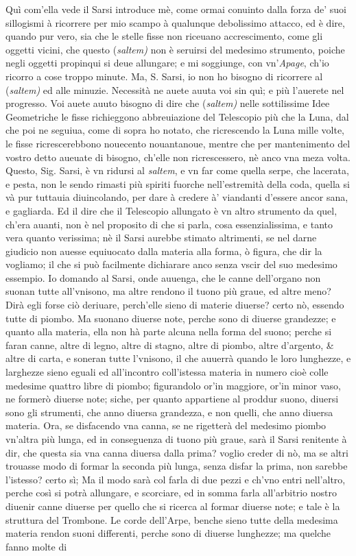 \documentclass[11pt,twoside,openany]{book}
\begin{document}
Quì com'ella vede il Sarsi introduce mè, come ormai conuinto dalla forza de' suoi sillogismi à ricorrere per mio scampo à qualunque debolissimo attacco, ed è dire, quando pur vero, sia che le stelle fisse non riceuano accrescimento, come gli oggetti vicini, che questo (\textit{saltem}\textit{)} non è seruirsi del medesimo strumento, poiche negli oggetti propinqui si deue allungare; e mi soggiunge, con vn'\textit{Apage}, ch'io ricorro a cose troppo minute. Ma, S. Sarsi, io non ho bisogno di ricorrere al (\textit{saltem}\textit{) }ed alle minuzie. Necessità ne auete auuta voi sin quì; e più l'auerete nel progresso. Voi auete auuto bisogno di dire che (\textit{saltem}\textit{)} nelle sottilissime Idee Geometriche le fisse richieggono abbreuiazione del Telescopio più che la Luna, dal che poi ne seguiua, come di sopra ho notato, che ricrescendo la Luna mille volte, le fisse ricrescerebbono nouecento nouantanoue, mentre che per mantenimento del vostro detto aueuate di bisogno, ch'elle non ricrescessero, nè anco vna meza volta. Questo, Sig. Sarsi, è vn ridursi al \textit{saltem}, e vn far come quella serpe, che lacerata, e pesta, non le sendo rimasti più spiriti fuorche nell'estremità della coda, quella si và pur tuttauia diuincolando, per dare à credere à' viandanti d'essere ancor sana, e gagliarda. Ed il dire che il Telescopio allungato è vn altro strumento da quel, ch'era auanti, non è nel proposito di che si parla, cosa essenzialissima, e tanto vera quanto verissima; nè il Sarsi aurebbe stimato altrimenti, se nel darne giudicio non auesse equiuocato dalla materia alla forma, ò figura, che dir la vogliamo; il che si può facilmente dichiarare anco senza vscir del suo medesimo essempio. Io domando al Sarsi, onde auuenga, che le canne dell'organo non suonan tutte all'vnisono, ma altre rendono il tuono più graue, ed altre meno? Dirà egli forse ciò deriuare, perch'elle sieno di materie diuerse? certo nò, essendo tutte di piombo. Ma suonano diuerse note, perche sono di diuerse grandezze; e quanto alla materia, ella non hà parte alcuna nella forma del suono; perche si faran canne, altre di legno, altre di stagno, altre di piombo, altre d'argento, \& altre di carta, e soneran tutte l'vnisono, il che auuerrà quando le loro lunghezze, e larghezze sieno eguali ed all'incontro coll'istessa materia in numero cioè colle medesime quattro libre di piombo; figurandolo or'in maggiore, or'in minor vaso, ne formerò diuerse note; siche, per quanto appartiene al proddur suono, diuersi sono gli strumenti, che anno diuersa grandezza, e non quelli, che anno diuersa materia. Ora, se disfacendo vna canna, se ne rigetterà del medesimo piombo vn'altra più lunga, ed in conseguenza di tuono più graue, sarà il Sarsi renitente à dir, che questa sia vna canna diuersa dalla prima? voglio creder di nò, ma se altri trouasse modo di formar la seconda più lunga, senza disfar la prima, non sarebbe l'istesso? certo sì; Ma il modo sarà col farla di due pezzi e ch'vno entri nell'altro, perche così si potrà allungare, e scorciare, ed in somma farla all'arbitrio nostro diuenir canne diuerse per quello che si ricerca al formar diuerse note; e tale è la struttura del Trombone. Le corde dell'Arpe, benche sieno tutte della medesima materia rendon suoni differenti, perche sono di diuerse lunghezze; ma quelche fanno molte di 
\end{document}
